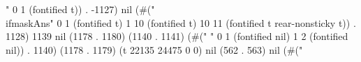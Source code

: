 " 0 1 (fontified t)) . -1127) nil (#(" \\ifmaskAns" 0 1 (fontified t) 1 10 (fontified t) 10 11 (fontified t rear-nonsticky t)) . 1128) 1139 nil (1178 . 1180) (1140 . 1141) (#("  " 0 1 (fontified nil) 1 2 (fontified nil)) . 1140) (1178 . 1179) (t 22135 24475 0 0) nil (562 . 563) nil (#("%
